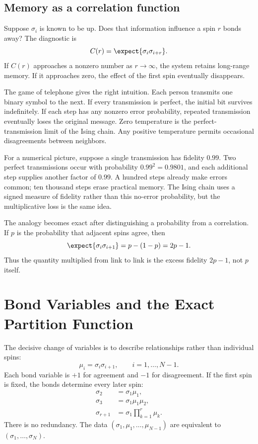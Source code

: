 \subsection{Memory as a correlation function}

Suppose \(\sigma_i\) is known to be up. Does that information influence a spin \(r\) bonds away? The diagnostic is
\begin{equation}
C(r)=\expect{\sigma_i\sigma_{i+r}}.
\end{equation}
If \(C(r)\) approaches a nonzero number as \(r\to\infty\), the system retains long-range memory. If it approaches zero, the effect of the first spin eventually disappears.

The game of telephone gives the right intuition. Each person transmits one binary symbol to the next. If every transmission is perfect, the initial bit survives indefinitely. If each step has any nonzero error probability, repeated transmission eventually loses the original message. Zero temperature is the perfect-transmission limit of the Ising chain. Any positive temperature permits occasional disagreements between neighbors.

For a numerical picture, suppose a single transmission has fidelity \(0.99\). Two perfect transmissions occur with probability \(0.99^2=0.9801\), and each additional step supplies another factor of \(0.99\). A hundred steps already make errors common; ten thousand steps erase practical memory. The Ising chain uses a signed measure of fidelity rather than this no-error probability, but the multiplicative loss is the same idea.

The analogy becomes exact after distinguishing a probability from a correlation. If \(p\) is the probability that adjacent spins agree, then
\begin{equation}
\expect{\sigma_i\sigma_{i+1}}
=p-(1-p)=2p-1.
\end{equation}
Thus the quantity multiplied from link to link is the excess fidelity \(2p-1\), not \(p\) itself.

\section{Bond Variables and the Exact Partition Function}

The decisive change of variables is to describe relationships rather than individual spins:
\begin{equation}
\mu_i=\sigma_i\sigma_{i+1},
\qquad i=1,\ldots,N-1.
\label{eq:bond-variable}
\end{equation}
Each bond variable is \(+1\) for agreement and \(-1\) for disagreement. If the first spin is fixed, the bonds determine every later spin:
\begin{align}
\sigma_2&=\sigma_1\mu_1,\\
\sigma_3&=\sigma_1\mu_1\mu_2,\\
\sigma_{r+1}&=\sigma_1\prod_{k=1}^{r}\mu_k.
\end{align}
There is no redundancy. The data \((\sigma_1,\mu_1,\ldots,\mu_{N-1})\) are equivalent to \((\sigma_1,\ldots,\sigma_N)\).

